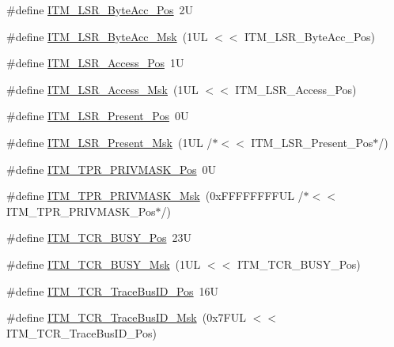 \begin{DoxyCompactItemize}
\item 
\#define \mbox{\hyperlink{group___c_m_s_i_s___i_t_m_gabfae3e570edc8759597311ed6dfb478e}{I\+T\+M\+\_\+\+L\+S\+R\+\_\+\+Byte\+Acc\+\_\+\+Pos}}~2U
\item 
\#define \mbox{\hyperlink{group___c_m_s_i_s___i_t_m_ga91f492b2891bb8b7eac5b58de7b220f4}{I\+T\+M\+\_\+\+L\+S\+R\+\_\+\+Byte\+Acc\+\_\+\+Msk}}~(1\+U\+L $<$$<$ I\+T\+M\+\_\+\+L\+S\+R\+\_\+\+Byte\+Acc\+\_\+\+Pos)
\item 
\#define \mbox{\hyperlink{group___c_m_s_i_s___i_t_m_ga144a49e12b83ad9809fdd2769094fdc0}{I\+T\+M\+\_\+\+L\+S\+R\+\_\+\+Access\+\_\+\+Pos}}~1U
\item 
\#define \mbox{\hyperlink{group___c_m_s_i_s___i_t_m_gac8ae69f11c0311da226c0c8ec40b3d37}{I\+T\+M\+\_\+\+L\+S\+R\+\_\+\+Access\+\_\+\+Msk}}~(1\+U\+L $<$$<$ I\+T\+M\+\_\+\+L\+S\+R\+\_\+\+Access\+\_\+\+Pos)
\item 
\#define \mbox{\hyperlink{group___c_m_s_i_s___i_t_m_gaf5740689cf14564d3f3fd91299b6c88d}{I\+T\+M\+\_\+\+L\+S\+R\+\_\+\+Present\+\_\+\+Pos}}~0U
\item 
\#define \mbox{\hyperlink{group___c_m_s_i_s___i_t_m_gaa5bc2a7f5f1d69ff819531f5508bb017}{I\+T\+M\+\_\+\+L\+S\+R\+\_\+\+Present\+\_\+\+Msk}}~(1\+U\+L /$\ast$$<$$<$ I\+T\+M\+\_\+\+L\+S\+R\+\_\+\+Present\+\_\+\+Pos$\ast$/)
\item 
\#define \mbox{\hyperlink{group___c_m_s_i_s___i_t_m_ga7abe5e590d1611599df87a1884a352e8}{I\+T\+M\+\_\+\+T\+P\+R\+\_\+\+P\+R\+I\+V\+M\+A\+S\+K\+\_\+\+Pos}}~0U
\item 
\#define \mbox{\hyperlink{group___c_m_s_i_s___i_t_m_ga168e089d882df325a387aab3a802a46b}{I\+T\+M\+\_\+\+T\+P\+R\+\_\+\+P\+R\+I\+V\+M\+A\+S\+K\+\_\+\+Msk}}~(0x\+F\+F\+F\+F\+F\+F\+F\+F\+U\+L /$\ast$$<$$<$ I\+T\+M\+\_\+\+T\+P\+R\+\_\+\+P\+R\+I\+V\+M\+A\+S\+K\+\_\+\+Pos$\ast$/)
\item 
\#define \mbox{\hyperlink{group___c_m_s_i_s___i_t_m_ga9174ad4a36052c377cef4e6aba2ed484}{I\+T\+M\+\_\+\+T\+C\+R\+\_\+\+B\+U\+S\+Y\+\_\+\+Pos}}~23U
\item 
\#define \mbox{\hyperlink{group___c_m_s_i_s___i_t_m_ga43ad7cf33de12f2ef3a412d4f354c60f}{I\+T\+M\+\_\+\+T\+C\+R\+\_\+\+B\+U\+S\+Y\+\_\+\+Msk}}~(1\+U\+L $<$$<$ I\+T\+M\+\_\+\+T\+C\+R\+\_\+\+B\+U\+S\+Y\+\_\+\+Pos)
\item 
\#define \mbox{\hyperlink{group___c_m_s_i_s___i_t_m_gaca0281de867f33114aac0636f7ce65d3}{I\+T\+M\+\_\+\+T\+C\+R\+\_\+\+Trace\+Bus\+I\+D\+\_\+\+Pos}}~16U
\item 
\#define \mbox{\hyperlink{group___c_m_s_i_s___i_t_m_ga60c20bd9649d1da5a2be8e656ba19a60}{I\+T\+M\+\_\+\+T\+C\+R\+\_\+\+Trace\+Bus\+I\+D\+\_\+\+Msk}}~(0x7\+F\+U\+L $<$$<$ I\+T\+M\+\_\+\+T\+C\+R\+\_\+\+Trace\+Bus\+I\+D\+\_\+\+Pos)

\end{DoxyCompactItemize}
